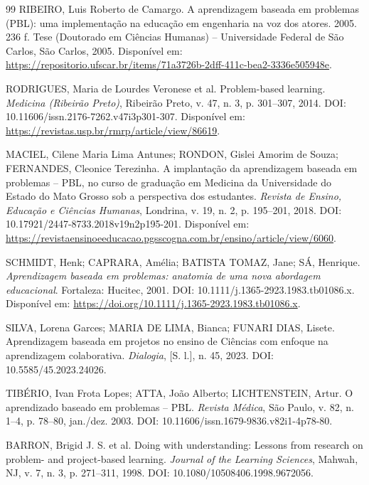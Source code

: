 \begin{thebibliography}{99}
RIBEIRO, Luis Roberto de Camargo. A aprendizagem baseada em problemas (PBL): uma implementação na educação em engenharia na voz dos atores. 2005. 236 f. Tese (Doutorado em Ciências Humanas) -- Universidade Federal de São Carlos, São Carlos, 2005. Disponível em: \url{https://repositorio.ufscar.br/items/71a3726b-2dff-411c-bea2-3336e505948e}.

RODRIGUES, Maria de Lourdes Veronese et al. Problem-based learning. \textit{Medicina (Ribeirão Preto)}, Ribeirão Preto, v. 47, n. 3, p. 301--307, 2014. DOI: 10.11606/issn.2176-7262.v47i3p301-307. Disponível em: \url{https://revistas.usp.br/rmrp/article/view/86619}.

MACIEL, Cilene Maria Lima Antunes; RONDON, Gislei Amorim de Souza; FERNANDES, Cleonice Terezinha. A implantação da aprendizagem baseada em problemas -- PBL, no curso de graduação em Medicina da Universidade do Estado do Mato Grosso sob a perspectiva dos estudantes. \textit{Revista de Ensino, Educação e Ciências Humanas}, Londrina, v. 19, n. 2, p. 195--201, 2018. DOI: 10.17921/2447-8733.2018v19n2p195-201. Disponível em: \url{https://revistaensinoeeducacao.pgsscogna.com.br/ensino/article/view/6060}.

SCHMIDT, Henk; CAPRARA, Amélia; BATISTA TOMAZ, Jane; SÁ, Henrique. \textit{Aprendizagem baseada em problemas: anatomia de uma nova abordagem educacional}. Fortaleza: Hucitec, 2001. DOI: 10.1111/j.1365-2923.1983.tb01086.x. Disponível em: \url{https://doi.org/10.1111/j.1365-2923.1983.tb01086.x}.

SILVA, Lorena Garces; MARIA DE LIMA, Bianca; FUNARI DIAS, Lisete. Aprendizagem baseada em projetos no ensino de Ciências com enfoque na aprendizagem colaborativa. \textit{Dialogia}, [S. l.], n. 45, 2023. DOI: 10.5585/45.2023.24026.

TIBÉRIO, Ivan Frota Lopes; ATTA, João Alberto; LICHTENSTEIN, Artur. O aprendizado baseado em problemas -- PBL. \textit{Revista Médica}, São Paulo, v. 82, n. 1--4, p. 78--80, jan./dez. 2003. DOI: 10.11606/issn.1679-9836.v82i1-4p78-80.


BARRON, Brigid J. S. et al. Doing with understanding: Lessons from research on problem- and project-based learning. \textit{Journal of the Learning Sciences}, Mahwah, NJ, v. 7, n. 3, p. 271--311, 1998. DOI: 10.1080/10508406.1998.9672056.


\end{thebibliography}
